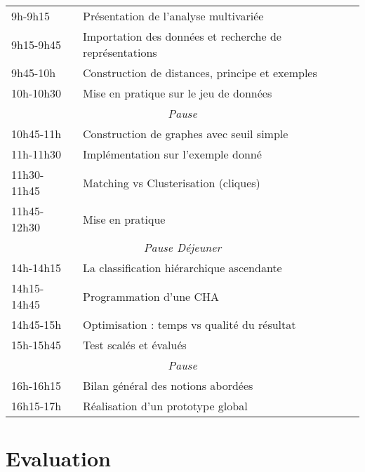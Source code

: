 \documentclass[a4paper,11pt]{article}
\newcommand{\td}{
\cellcolor{black!10}
}
\begin{document}
\begin{table}[h]

\begin{tabular}{l|l}
9h-9h15 & Présentation de l'analyse multivariée \\
9h15-9h45 &\td Importation des données et recherche de représentations\\
9h45-10h & Construction de distances, principe et exemples\\
10h-10h30 &\td Mise en pratique sur le jeu de données\\
\hline
\multicolumn{2}{c}{\textit{Pause}}\\
\hline
10h45-11h & Construction de graphes avec seuil simple  \\
11h-11h30 &\td Implémentation sur l'exemple donné \\
11h30-11h45 &  Matching vs Clusterisation (cliques) \\
11h45-12h30 &\td  Mise en pratique\\
\hline
\multicolumn{2}{c}{\textit{Pause Déjeuner}}\\
\hline
14h-14h15 & La classification hiérarchique ascendante\\
14h15-14h45 &\td Programmation d'une CHA \\
14h45-15h & Optimisation : temps vs qualité du résultat\\
15h-15h45 &\td Test scalés et évalués \\
\hline
\multicolumn{2}{c}{\textit{Pause}}\\
\hline
16h-16h15 & Bilan général des notions abordées \\
16h15-17h &\td Réalisation d'un prototype global 
\\
\end{tabular}
\end{table}

\section{Evaluation}
\end{document}
